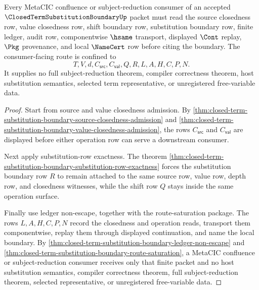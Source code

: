 \begin{theorem}
\label{thm:closed-term-substitution-boundary-metacic-consumer-nonescape}
Every MetaCIC confluence or subject-reduction consumer of an accepted $\ClosedTermSubstitutionBoundaryUp$ packet must read the source closedness row, value closedness row, shift boundary row, substitution boundary row, finite ledger, audit row, componentwise $\hsame$ transport, displayed $\Cont$ replay, $\Pkg$ provenance, and local $\NameCert$ row before citing the boundary. The consumer-facing route is confined to
$$
T,V,d,C_{\mathsf{src}},C_{\mathsf{val}},Q,R,L,A,H,C,P,N.
$$
It supplies no full subject-reduction theorem, compiler correctness theorem, host substitution semantics, selected term representative, or unregistered free-variable data.
\end{theorem}
\begin{proof}
Start from source and value closedness admission. By \autoref{thm:closed-term-substitution-boundary-source-closedness-admission} and \autoref{thm:closed-term-substitution-boundary-value-closedness-admission}, the rows $C_{\mathsf{src}}$ and $C_{\mathsf{val}}$ are displayed before either operation row can serve a downstream consumer.

Next apply substitution-row exactness. The theorem \autoref{thm:closed-term-substitution-boundary-substitution-row-exactness} forces the substitution boundary row $R$ to remain attached to the same source row, value row, depth row, and closedness witnesses, while the shift row $Q$ stays inside the same operation surface.

Finally use ledger non-escape, together with the route-saturation package. The rows $L,A,H,C,P,N$ record the closedness and operation reads, transport them componentwise, replay them through displayed continuation, and name the local boundary. By \autoref{thm:closed-term-substitution-boundary-ledger-non-escape} and \autoref{thm:closed-term-substitution-boundary-route-saturation}, a MetaCIC confluence or subject-reduction consumer receives only that finite packet and no host substitution semantics, compiler correctness theorem, full subject-reduction theorem, selected representative, or unregistered free-variable data.
\end{proof}

